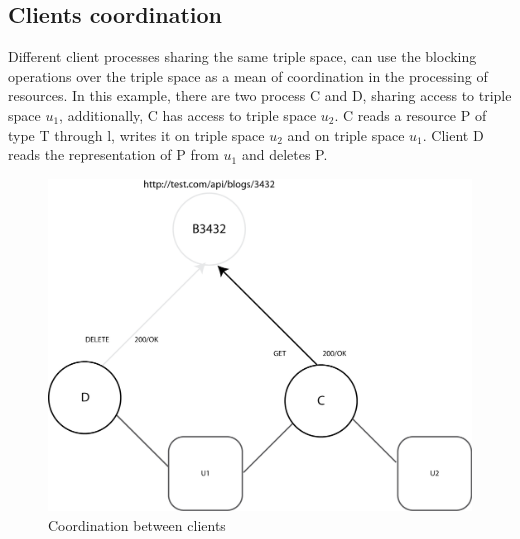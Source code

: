 \subsection{Clients coordination}

Different client processes sharing the same triple space, can use the blocking operations over the triple space as a mean of coordination in the processing of resources. In this example, there are two process C and D, sharing access to triple space $u_1$, additionally, C has access to triple space $u_2$. C reads a resource P of type T through l, writes it on triple space $u_2$ and on triple space $u_1$. Client D reads the representation of P from $u_1$ and deletes P.
\\
\begin{figure}[htb!]
\centering%
\includegraphics{coord.png}
\caption{Coordination between clients}
\end{figure}


